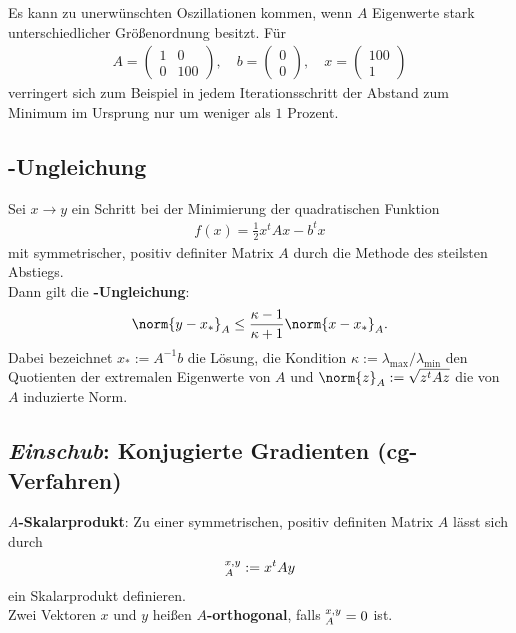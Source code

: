 Es kann zu unerwünschten Oszillationen kommen, wenn $A$ Eigenwerte stark
unterschiedlicher Größenordnung besitzt.
Für
\begin{align*}
    A = \begin{pmatrix}1 & 0\\0 & 100\end{pmatrix}, \quad
    b = \begin{pmatrix}0\\0\end{pmatrix}, \quad
    x = \begin{pmatrix}100\\1\end{pmatrix}
\end{align*}
verringert sich zum Beispiel in jedem Iterationsschritt der Abstand zum Minimum
im Ursprung nur um weniger als $1$ Prozent.

\subsection{%
    -Ungleichung%
}

Sei $x \rightarrow y$ ein Schritt bei der Minimierung der quadratischen
Funktion
\begin{align*}
    f(x) = \frac{1}{2} x^t A x - b^t x
\end{align*}
mit symmetrischer, positiv definiter Matrix $A$ durch die Methode des steilsten
Abstiegs. \\
Dann gilt die \textbf{-Ungleichung}:
\begin{align*}
    \norm{y - x_\ast}_A \le \frac{\kappa - 1}{\kappa + 1} \norm{x - x_\ast}_A.
\end{align*}
Dabei bezeichnet $x_\ast := A^{-1} b$ die Lösung, die Kondition
$\kappa := \lambda_{\max} / \lambda_{\min}$ den Quotienten der extremalen
Eigenwerte von $A$ und $\norm{z}_A := \sqrt{z^t A z}$ die von $A$ induzierte
Norm.

\subsection{%
    \emph{Einschub}: Konjugierte Gradienten (cg-Verfahren)%
}

\textbf{$A$-Skalarprodukt}:
Zu einer symmetrischen, positiv definiten Matrix $A$ lässt sich durch
\begin{align*}
    \sp{x, y}_A := x^t A y
\end{align*}
ein Skalarprodukt definieren. \\
Zwei Vektoren $x$ und $y$ heißen \textbf{$A$-orthogonal}, falls
$\sp{x, y}_A = 0$ ist.

